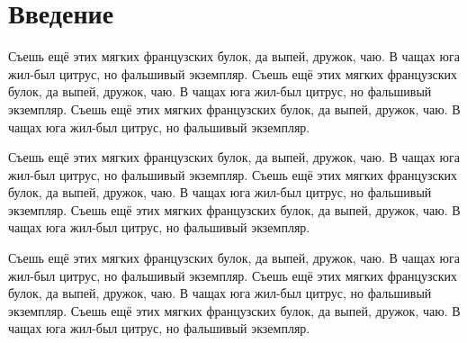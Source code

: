 \chapter*{Введение}

\setcounter{page}{5}

Съешь ещё этих мягких французских булок, да выпей, дружок, чаю. В чащах юга жил-был цитрус, но фальшивый экземпляр. Съешь ещё этих мягких французских булок, да выпей, дружок, чаю. В чащах юга жил-был цитрус, но фальшивый экземпляр. Съешь ещё этих мягких французских булок, да выпей, дружок, чаю. В чащах юга жил-был цитрус, но фальшивый экземпляр.

Съешь ещё этих мягких французских булок, да выпей, дружок, чаю. В чащах юга жил-был цитрус, но фальшивый экземпляр. Съешь ещё этих мягких французских булок, да выпей, дружок, чаю. В чащах юга жил-был цитрус, но фальшивый экземпляр. Съешь ещё этих мягких французских булок, да выпей, дружок, чаю. В чащах юга жил-был цитрус, но фальшивый экземпляр.

Съешь ещё этих мягких французских булок, да выпей, дружок, чаю. В чащах юга жил-был цитрус, но фальшивый экземпляр. Съешь ещё этих мягких французских булок, да выпей, дружок, чаю. В чащах юга жил-был цитрус, но фальшивый экземпляр. Съешь ещё этих мягких французских булок, да выпей, дружок, чаю. В чащах юга жил-был цитрус, но фальшивый экземпляр.


